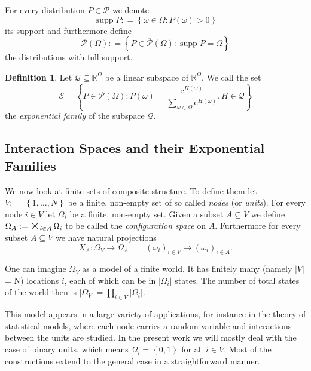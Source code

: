\documentclass[12pt]{amsart}
\newcommand{\set}[1]{\left\lbrace #1 \right\rbrace} %
\newcommand{\defas}{\mathrel{\mathop{:}}=}   %
\renewcommand{\subset}{\subseteq}  %
\DeclareMathOperator*{\bigtimes}{\textnormal{\Large $\times$}} %
\DeclareMathOperator*{\supp}{supp}
\providecommand{\abs}[1]{\left\lvert#1\right\rvert}
\newcommand{\e}{\mathrm{e}} %
\theoremstyle{plain}%
\theoremstyle{definition}
\newtheorem{defn}[thm]{Definition}
\theoremstyle{remark}
\begin{document}
For every distribution $P\in\overline{\mathcal{P}}$ we denote
\begin{equation*}
  \supp P \defas \set{\omega \in \Omega : P(\omega) > 0}
\end{equation*}
its support and furthermore define
\begin{equation*}
  \mathcal{P}(\Omega) \defas \set{P\in\overline{\mathcal{P}}(\Omega) : \supp P = \Omega}
\end{equation*}
the distributions with full support.

\begin{defn} Let $\mathcal{Q} \subset
  \mathbb{R}^{\Omega}$ be a linear subspace of $\mathbb{R}^{\Omega}$.
  We call the set
  \begin{equation*}
    \mathcal{E} = \set { P \in \mathcal{P}(\Omega) : P(\omega)= \frac{\e^{H(\omega)}}
      {\sum_{\omega\in\Omega} \e^{H(\omega)}} , H \in \mathcal{Q}} 
  \end{equation*}
  the \emph{exponential family} of the subspace $\mathcal{Q}$.
\end{defn}

\subsection{Interaction Spaces and their Exponential Families}

We now look at finite sets of composite structure.  To define them let
$V\defas \set{1,\ldots,N}$ be a finite, non-empty set of so called
\emph{nodes} (or \emph{units}).    For every
node $i \in V$ let $\Omega_i$ be a finite, non-empty set. Given a
subset $A\subset V$ we define $\Omega_A \defas \bigtimes_{i\in A}
\Omega_i$ to be called the \emph{configuration space}
 on $A$.  Furthermore for every subset
$A\subset V$ we have natural projections
\begin{equation*}
  X_A : \Omega_V \to \Omega_A \qquad (\omega_i)_{i\in V} 
  \mapsto (\omega_i)_{i\in A}.
\end{equation*}

One can imagine $\Omega_V$ as a model of a finite world. It has
finitely many (namely $\abs{V}$ = N) locations $i$, each of which can
be in $\abs{\Omega_i}$ states. The number of total
states of the world then is $\abs{\Omega_V} = \prod_{i\in V}
\abs{\Omega_i}$.

This model appears in a large variety of applications, for instance in
the theory of statistical models, where each node carries a random
variable and interactions between the units are studied. In the
present work we will mostly deal with the case of binary units, which
means $\Omega_i = \set{0,1}$ for all $i\in V$. Most of the
constructions extend to the general case in a straightforward manner.
\end{document}
